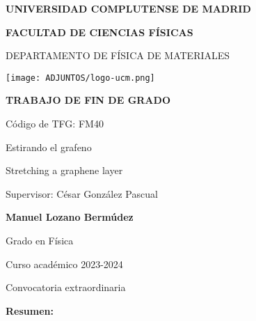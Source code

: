 \documentclass[11pt, a4paper]{article} %
\begin{document}
\begin{titlepage}
\centering
{ \bfseries \Large UNIVERSIDAD COMPLUTENSE DE MADRID}
\vspace{0.5cm}

{\bfseries  \Large FACULTAD DE CIENCIAS FÍSICAS} 
\vspace{1cm}

{\large DEPARTAMENTO DE FÍSICA DE MATERIALES}
\vspace{0.8cm}

{\texttt{[image: ADJUNTOS/logo-ucm.png]}}

\vspace{0.8cm}


{\bfseries \Large TRABAJO DE FIN DE GRADO}
\vspace{2cm}

{\Large Código de TFG:  FM40 } \vspace{5mm}

{\Large Estirando el grafeno}\vspace{5mm}

{\Large Stretching a graphene layer}\vspace{5mm}

{\Large Supervisor: César González Pascual}\vspace{20mm} 

{\bfseries \LARGE Manuel Lozano Bermúdez}\vspace{5mm} 

{\large Grado en Física}\vspace{5mm} 

{\large Curso acad\'emico 2023-2024}\vspace{5mm} 

{\large Convocatoria extraordinaria}\vspace{5mm} 

\end{titlepage}
\newpage



{\bfseries \large Resumen:} \vspace{5mm}


\vspace{1cm}
\end{document}

